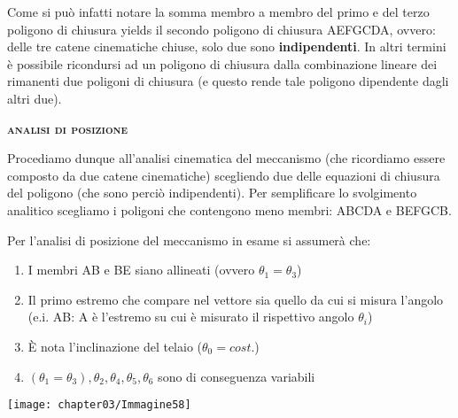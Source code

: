		Come si può infatti notare la somma membro a membro del primo e del terzo poligono di chiusura yields il secondo poligono di chiusura AEFGCDA, ovvero: delle tre catene cinematiche chiuse, solo due sono \textbf{indipendenti}. In altri termini è possibile ricondursi ad un poligono di chiusura dalla combinazione lineare dei rimanenti due poligoni di chiusura (e questo rende tale poligono dipendente dagli altri due).
		
		
		\begin{center}
		{\scshape{\bfseries analisi di posizione}}
		\end{center}
		
		\begin{minipage}{.6\textwidth}
		Procediamo dunque all'analisi cinematica del meccanismo (che ricordiamo essere composto da due catene cinematiche) scegliendo due delle equazioni di chiusura del poligono (che sono perciò indipendenti).
		Per semplificare lo svolgimento analitico scegliamo i poligoni che contengono meno membri: ABCDA e BEFGCB.
		
				Per l'analisi di posizione del meccanismo in esame si assumerà che:
		\begin{enumerate}[$\rightarrow$]
		\item I membri AB e BE siano allineati (ovvero $\theta_1 = \theta_3$) 
		\item Il primo estremo che compare nel vettore sia quello da cui si misura l'angolo (e.i. AB: A è l'estremo su cui è misurato il rispettivo angolo $\theta_i$)
		\item È nota l'inclinazione del telaio ($\theta_0 = cost.$)
		\item $(\theta_1=\theta_3), \theta_2, \theta_4, \theta_5, \theta_6$ sono di conseguenza variabili
		\end{enumerate}
		\end{minipage}
		\hfill
		\begin{minipage}{.4\textwidth}
		\centering
		\texttt{[image: chapter03/Immagine58]}
		\end{minipage}
		
